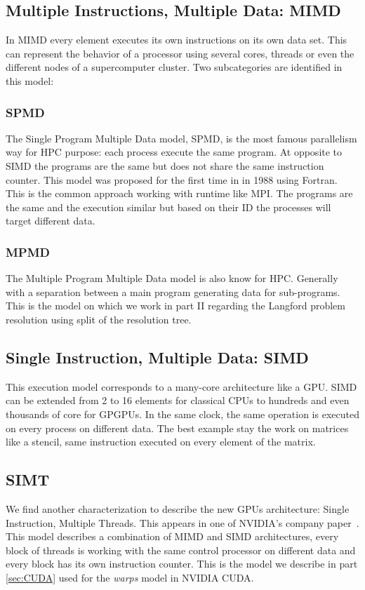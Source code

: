 \subsection{Multiple Instructions, Multiple Data: MIMD}
In MIMD every element executes its own instructions on its own data set. 
This can represent the behavior of a processor using several cores, threads or even the different nodes of a supercomputer cluster. 
Two subcategories are identified in this model:

\subsubsection{SPMD}
The Single Program Multiple Data model, SPMD, is the most famous parallelism way for HPC purpose: each process execute the same program. 
At opposite to SIMD the programs are the same but does not share the same instruction counter. 
This model was proposed for the first time in \cite{darema1988single} in 1988 using Fortran.
This is the common approach working with runtime like MPI. 
The programs are the same and the execution similar but based on their ID the processes will target different data. 

\subsubsection{MPMD}
The Multiple Program Multiple Data model is also know for HPC. 
Generally with a separation between a main program generating data for sub-programs. 
This is the model on which we work in part II regarding the Langford problem resolution using split of the resolution tree.

\subsection{Single Instruction, Multiple Data: SIMD}
This execution model corresponds to a many-core architecture like a GPU. 
SIMD can be extended from 2 to 16 elements for classical CPUs to hundreds and even thousands of core for GPGPUs. 
In the same clock, the same operation is executed on every process on different data. 
The best example stay the work on matrices like a stencil, same instruction executed on every element of the matrix. 

\subsection{SIMT}
We find another characterization to describe the new GPUs architecture: Single Instruction, Multiple Threads. 
This appears in one of NVIDIA's company paper~\cite{lindholm2008nvidia}. 
This model describes a combination of MIMD and SIMD architectures, every block of threads is working with the same control processor on different data and every block has its own instruction counter.  
This is the model we describe in part \ref{sec:CUDA} used for the \textit{warps} model in NVIDIA CUDA.

